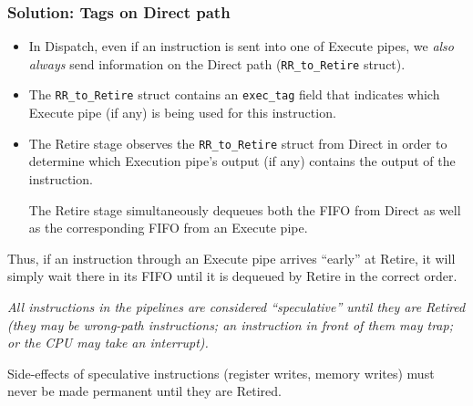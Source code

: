 
\begin{frame}[fragile]
\frametitle{Solution: Tags on Direct path}

\footnotesize

\begin{itemize}

 \item In Dispatch, even if an instruction is sent into one of Execute
       pipes, we \emph{also always} send information on the Direct
       path ({\tt RR\_to\_Retire} struct).

 \vspace{1ex}

 \item The {\tt RR\_to\_Retire} struct contains an {\tt exec\_tag}
       field that indicates which Execute pipe (if any) is being used
       for this instruction.

 \vspace{1ex}

 \item The Retire stage observes the {\tt RR\_to\_Retire} struct from
       Direct in order to determine which Execution pipe's output (if
       any) contains the output of the instruction.

       The Retire stage simultaneously dequeues both the FIFO from
       Direct as well as the corresponding FIFO from an Execute pipe.
\end{itemize}

\vspace{1ex}

Thus, if an instruction through an Execute pipe arrives ``early'' at
Retire, it will simply wait there in its FIFO until it is dequeued by
Retire in the correct order.

\vspace{4ex}

{\normalsize \emph{All instructions in the pipelines are considered ``speculative'' until
they are Retired (they may be wrong-path instructions; an instruction
in front of them may trap; or the CPU may take an interrupt).}}

\vspace{1ex}

Side-effects of speculative instructions (register writes, memory
writes) must never be made permanent until they are Retired.

\end{frame}

